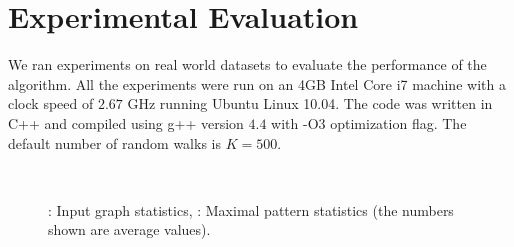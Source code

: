 \section{ Experimental Evaluation} 

We ran experiments on real world datasets to
evaluate the performance of the algorithm. All the experiments were run
on an 4GB Intel Core i7 machine with a clock speed of $2.67$ GHz running
Ubuntu Linux 10.04. The code was written in C++ and 
compiled using g++ version $4.4$ with -O3
optimization flag. The default number of random walks is $K=500$.

\begin{comment}
\begin{table}[!h]
  \centering
    \begin{tabular}{|c|c|c|c|c|}
      \hline
      Dataset & $|V|$ & $|E|$ & $|\Sigma|$ & \small{Preprocessing time(sec)} \\
      \hline
      CMDB & $10466$ & $15122$ & $84$ & $329.31$ \\
      SCOP & $39256$ & $154328$ & $20$ & $17.377$ \\
      PPI & $4950$ & $16515$ & $4950$ & $339.45 $\\
	  \hline
    \end{tabular}
    \caption{Dataset Properties}
	\label{tab:db}
\end{table}
\end{comment}


\begin{figure}[!h]
\centering
{} \\
  \caption{ \protect{}: Input graph statistics, 
    \protect{}: Maximal pattern statistics (the numbers
    shown are average values).
  }
  \label{fig:stats}
\end{figure}

